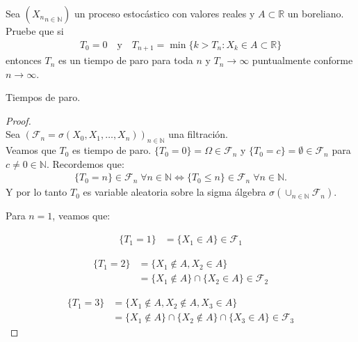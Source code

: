 \begin{problema}
	Sea ${\left({X_n}_{n\in\mathbb{N}}\right)}$ un proceso estocástico con valores reales y ${A\subset \mathbb{R}}$ un boreliano. 
	Pruebe que si
	\begin{align}
		T_0=0\quad\text{y}\quad T_{n+1}=\min\{k>T_n: X_k\in A \subset \mathbb{R}\}
	\end{align}
	entonces ${T_n}$ es un tiempo de paro para toda ${n}$ y ${T_n\to \infty}$ puntualmente conforme ${n\to\infty}$. 

	\begin{categoria} 
		Tiempos de paro.
	\end{categoria}
\end{problema}
		
\begin{proof}
\\

	Sea ${(\mathscr{F}_n = \sigma(  X_0, X_1, \dots, X_n ))_{ n \in \mathbb{N}}}$ una filtración.
\\

	Veamos que ${T_0}$ es tiempo de paro. ${\{T_0 = 0\} = \Omega \in \mathscr{F}_n}$ y 
	${\{T_0 = c\} = \emptyset \in \mathscr{F}_n}$ para ${c \not= 0 \in \mathbb{N}}$. Recordemos que:		
	\begin{align}\label{problema_1_1:equivalencia_varable_aleatoria}
		\{T_0 = n\} \in \mathscr{F}_n \; \forall n \in \mathbb{N} \iff 
		\{T_0 \leq n\} \in \mathscr{F}_n \; \forall n \in \mathbb{N}.
	\end{align}
	Y por lo tanto ${T_0}$ es variable aleatoria sobre la sigma álgebra ${\sigma(\cup_{n \in \mathbb{N}} 
	\mathscr{F}_n)}$.

	Para ${n=1}$, veamos que:
 
	\begin{align}
			\{T_1 = 1\}     &= \{ X_1 \in A \}	\in \mathscr{F}_1 
	\end{align}
	
	\begin{align}
			\{T_1 = 2\} 	&= 	\{ X_1 \not\in A, X_2 \in A \} \\
							&= 	\{ X_1 \not\in A \} \cap \{X_2 \in A \} \in \mathscr{F}_2	
	\end{align}
	
	\begin{align}
			\{T_1 = 3\} 	&=	\{ X_1 \not\in A, X_2 \not\in A,  X_3 \in A \} \\ 
							&= 	\{ X_1 \not\in A \} \cap \{ X_2 \not\in A \} \cap \{X_3 \in A \} \in \mathscr{F}_3
	\end{align}
	

\end{proof}

